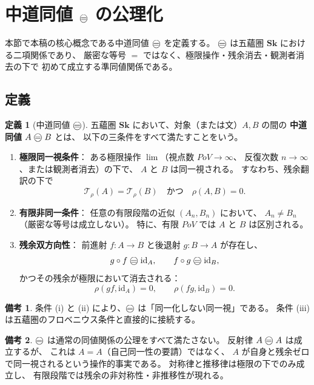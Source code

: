 \documentclass[11pt,a4paper]{article}
\theoremstyle{definition}
\newtheorem{definition}{定義}[section]
\newtheorem{remark}{備考}[section]
\newcommand{\Sk}{\mathbf{Sk}}
\newcommand{\PoV}{\mathit{PoV}}
\newcommand{\id}{\mathrm{id}}
\begin{document}
\section{中道同値 \texorpdfstring{$\mweq$}{mw-equivalence} の公理化}

本節で本稿の核心概念である中道同値 $\mweq$ を定義する。
$\mweq$ は五蘊圏 $\Sk$ における二項関係であり、
厳密な等号 $=$ ではなく、極限操作・残余消去・観測者消去の下で
初めて成立する準同値関係である。

\subsection{定義}

\begin{definition}[中道同値 $\mweq$]\label{def:mweq}
五蘊圏 $\Sk$ において、対象（または文）$A,B$ の間の
\textbf{中道同値} $A\mweq B$ とは、
以下の三条件をすべて満たすことをいう。
\begin{enumerate}[label=(\roman*)]
  \item \textbf{極限同一視条件}：
    ある極限操作 $\lim$（視点数 $\PoV\to\infty$、
    反復次数 $n\to\infty$、または観測者消去）の下で、
    $A$ と $B$ は同一視される。
    すなわち、残余翻訳の下で
    \[
    \mathcal{T}_\rho(A)=\mathcal{T}_\rho(B)
    \quad\text{かつ}\quad
    \rho(A,B)=0.
    \]
  \item \textbf{有限非同一条件}：
    任意の有限段階の近似 $(A_n,B_n)$ において、
    $A_n\neq B_n$（厳密な等号は成立しない）。
    特に、有限 $\PoV$ では $A$ と $B$ は区別される。
  \item \textbf{残余双方向性}：
    前進射 $f:A\to B$ と後退射 $g:B\to A$ が存在し、
    \[
    g\circ f \mweq \id_A,\qquad f\circ g \mweq \id_B,
    \]
    かつその残余が極限において消去される：
    \[
    \rho(gf,\id_A)=0,\qquad \rho(fg,\id_B)=0.
    \]
\end{enumerate}
\end{definition}

\begin{remark}
条件 (i) と (ii) により、$\mweq$ は「同一化しない同一視」である。
条件 (iii) は五蘊圏のフロベニウス条件と直接的に接続する。
\end{remark}

\begin{remark}
$\mweq$ は通常の同値関係の公理をすべて満たさない。
反射律 $A\mweq A$ は成立するが、
これは $A=A$（自己同一性の要請）ではなく、
$A$ が自身と残余ゼロで同一視されるという操作的事実である。
対称律と推移律は極限の下でのみ成立し、
有限段階では残余の非対称性・非推移性が現れる。
\end{remark}
\end{document}

